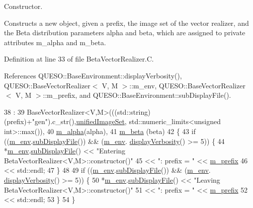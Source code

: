 Constructor. 

Constructs a new object, given a prefix, the image set of the vector realizer, and the Beta distribution parameters {\ttfamily alpha} and {\ttfamily beta}, which are assigned to private attributes m\-\_\-alpha and m\-\_\-beta. 

Definition at line 33 of file Beta\-Vector\-Realizer.\-C.



References Q\-U\-E\-S\-O\-::\-Base\-Environment\-::display\-Verbosity(), Q\-U\-E\-S\-O\-::\-Base\-Vector\-Realizer$<$ V, M $>$\-::m\-\_\-env, Q\-U\-E\-S\-O\-::\-Base\-Vector\-Realizer$<$ V, M $>$\-::m\-\_\-prefix, and Q\-U\-E\-S\-O\-::\-Base\-Environment\-::sub\-Display\-File().


\begin{DoxyCode}
38   :
39   BaseVectorRealizer<V,M>(((std::string)(prefix)+\textcolor{stringliteral}{"gen"}).c\_str(),\hyperlink{class_q_u_e_s_o_1_1_base_vector_realizer_ad958991bab8d6369e8a0d66b22a237d4}{unifiedImageSet},
      std::numeric\_limits<unsigned int>::max()),
40   \hyperlink{class_q_u_e_s_o_1_1_beta_vector_realizer_a9a1570ec745b892fafe325605a2dcb57}{m\_alpha}(alpha),
41   \hyperlink{class_q_u_e_s_o_1_1_beta_vector_realizer_a0f2c801dbb06b1a5e41817fb66d3d952}{m\_beta} (beta)
42 \{
43   \textcolor{keywordflow}{if} ((\hyperlink{class_q_u_e_s_o_1_1_base_vector_realizer_acde246c52f82d8ed687d91cfac14c29c}{m\_env}.\hyperlink{class_q_u_e_s_o_1_1_base_environment_a8a0064746ae8dddfece4229b9ad374d6}{subDisplayFile}()) && (\hyperlink{class_q_u_e_s_o_1_1_base_vector_realizer_acde246c52f82d8ed687d91cfac14c29c}{m\_env}.
      \hyperlink{class_q_u_e_s_o_1_1_base_environment_a1fe5f244fc0316a0ab3e37463f108b96}{displayVerbosity}() >= 5)) \{
44     *\hyperlink{class_q_u_e_s_o_1_1_base_vector_realizer_acde246c52f82d8ed687d91cfac14c29c}{m\_env}.\hyperlink{class_q_u_e_s_o_1_1_base_environment_a8a0064746ae8dddfece4229b9ad374d6}{subDisplayFile}() << \textcolor{stringliteral}{"Entering BetaVectorRealizer<V,M>::constructor()"}
45                             << \textcolor{stringliteral}{": prefix = "} << \hyperlink{class_q_u_e_s_o_1_1_base_vector_realizer_ac5559b6921816ccaed7afc2d342c2a32}{m\_prefix}
46                             << std::endl;
47   \}
48 
49   \textcolor{keywordflow}{if} ((\hyperlink{class_q_u_e_s_o_1_1_base_vector_realizer_acde246c52f82d8ed687d91cfac14c29c}{m\_env}.\hyperlink{class_q_u_e_s_o_1_1_base_environment_a8a0064746ae8dddfece4229b9ad374d6}{subDisplayFile}()) && (\hyperlink{class_q_u_e_s_o_1_1_base_vector_realizer_acde246c52f82d8ed687d91cfac14c29c}{m\_env}.
      \hyperlink{class_q_u_e_s_o_1_1_base_environment_a1fe5f244fc0316a0ab3e37463f108b96}{displayVerbosity}() >= 5)) \{
50     *\hyperlink{class_q_u_e_s_o_1_1_base_vector_realizer_acde246c52f82d8ed687d91cfac14c29c}{m\_env}.\hyperlink{class_q_u_e_s_o_1_1_base_environment_a8a0064746ae8dddfece4229b9ad374d6}{subDisplayFile}() << \textcolor{stringliteral}{"Leaving BetaVectorRealizer<V,M>::constructor()"}
51                             << \textcolor{stringliteral}{": prefix = "} << \hyperlink{class_q_u_e_s_o_1_1_base_vector_realizer_ac5559b6921816ccaed7afc2d342c2a32}{m\_prefix}
52                             << std::endl;
53   \}
54 \}
\end{DoxyCode}
